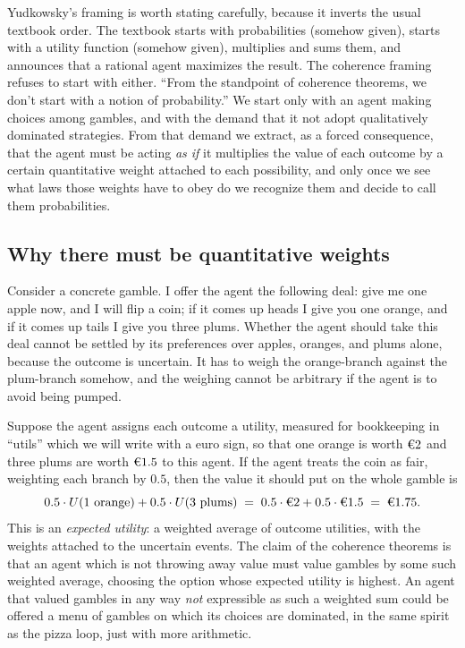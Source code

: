 \documentclass[10pt]{article}
\theoremstyle{definition}
\theoremstyle{remark}
\newcommand{\util}[1]{\text{\texteuro}#1}
\begin{document}
Yudkowsky's framing is worth stating carefully, because it inverts the usual textbook order. The textbook starts with probabilities (somehow given), starts with a utility function (somehow given), multiplies and sums them, and announces that a rational agent maximizes the result. The coherence framing refuses to start with either. ``From the standpoint of coherence theorems, we don't start with a notion of probability.'' We start only with an agent making choices among gambles, and with the demand that it not adopt qualitatively dominated strategies. From that demand we extract, as a forced consequence, that the agent must be acting \emph{as if} it multiplies the value of each outcome by a certain quantitative weight attached to each possibility, and only once we see what laws those weights have to obey do we recognize them and decide to call them probabilities.

\subsection{Why there must be quantitative weights}

Consider a concrete gamble. I offer the agent the following deal: give me one apple now, and I will flip a coin; if it comes up heads I give you one orange, and if it comes up tails I give you three plums. Whether the agent should take this deal cannot be settled by its preferences over apples, oranges, and plums alone, because the outcome is uncertain. It has to weigh the orange-branch against the plum-branch somehow, and the weighing cannot be arbitrary if the agent is to avoid being pumped.

Suppose the agent assigns each outcome a utility, measured for bookkeeping in ``utils'' which we will write with a euro sign, so that one orange is worth $\util{2}$ and three plums are worth $\util{1.5}$ to this agent. If the agent treats the coin as fair, weighting each branch by $0.5$, then the value it should put on the whole gamble is
\[
0.5 \cdot U(\text{1 orange}) + 0.5 \cdot U(\text{3 plums}) \;=\; 0.5 \cdot \util{2} + 0.5 \cdot \util{1.5} \;=\; \util{1.75}.
\]
This is an \emph{expected utility}: a weighted average of outcome utilities, with the weights attached to the uncertain events. The claim of the coherence theorems is that an agent which is not throwing away value must value gambles by some such weighted average, choosing the option whose expected utility is highest. An agent that valued gambles in any way \emph{not} expressible as such a weighted sum could be offered a menu of gambles on which its choices are dominated, in the same spirit as the pizza loop, just with more arithmetic.
\end{document}
